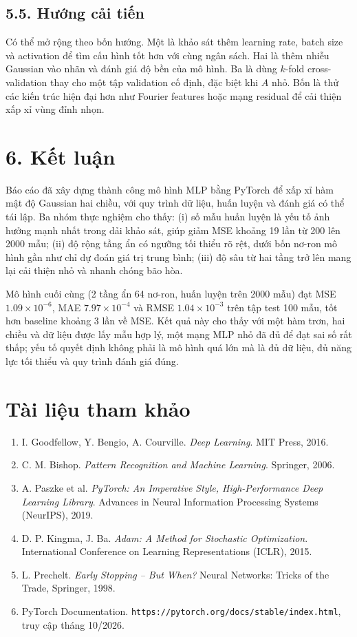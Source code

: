 \documentclass[12pt,a4paper]{article}
\begin{document}
\subsection{5.5. Hướng cải tiến}

Có thể mở rộng theo bốn hướng. Một là khảo sát thêm learning rate, batch size và activation để tìm cấu hình tốt hơn với cùng ngân sách. Hai là thêm nhiễu Gaussian vào nhãn và đánh giá độ bền của mô hình. Ba là dùng $k$-fold cross-validation thay cho một tập validation cố định, đặc biệt khi $A$ nhỏ. Bốn là thử các kiến trúc hiện đại hơn như Fourier features hoặc mạng residual để cải thiện xấp xỉ vùng đỉnh nhọn.

\section{6. Kết luận}

Báo cáo đã xây dựng thành công mô hình MLP bằng PyTorch để xấp xỉ hàm mật độ Gaussian hai chiều, với quy trình dữ liệu, huấn luyện và đánh giá có thể tái lập. Ba nhóm thực nghiệm cho thấy: (i) số mẫu huấn luyện là yếu tố ảnh hưởng mạnh nhất trong dải khảo sát, giúp giảm MSE khoảng 19 lần từ 200 lên 2000 mẫu; (ii) độ rộng tầng ẩn có ngưỡng tối thiểu rõ rệt, dưới bốn nơ-ron mô hình gần như chỉ dự đoán giá trị trung bình; (iii) độ sâu từ hai tầng trở lên mang lại cải thiện nhỏ và nhanh chóng bão hòa.

Mô hình cuối cùng (2 tầng ẩn 64 nơ-ron, huấn luyện trên 2000 mẫu) đạt MSE $1.09\times10^{-6}$, MAE $7.97\times10^{-4}$ và RMSE $1.04\times10^{-3}$ trên tập test 100 mẫu, tốt hơn baseline khoảng 3 lần về MSE. Kết quả này cho thấy với một hàm trơn, hai chiều và dữ liệu được lấy mẫu hợp lý, một mạng MLP nhỏ đã đủ để đạt sai số rất thấp; yếu tố quyết định không phải là mô hình quá lớn mà là đủ dữ liệu, đủ năng lực tối thiểu và quy trình đánh giá đúng.

\section*{Tài liệu tham khảo}

\begin{enumerate}
\item I. Goodfellow, Y. Bengio, A. Courville. \textit{Deep Learning}. MIT Press, 2016.
\item C. M. Bishop. \textit{Pattern Recognition and Machine Learning}. Springer, 2006.
\item A. Paszke et al. \textit{PyTorch: An Imperative Style, High-Performance Deep Learning Library}. Advances in Neural Information Processing Systems (NeurIPS), 2019.
\item D. P. Kingma, J. Ba. \textit{Adam: A Method for Stochastic Optimization}. International Conference on Learning Representations (ICLR), 2015.
\item L. Prechelt. \textit{Early Stopping -- But When?} Neural Networks: Tricks of the Trade, Springer, 1998.
\item PyTorch Documentation. \texttt{https://pytorch.org/docs/stable/index.html}, truy cập tháng 10/2026.
\end{enumerate}
\end{document}
